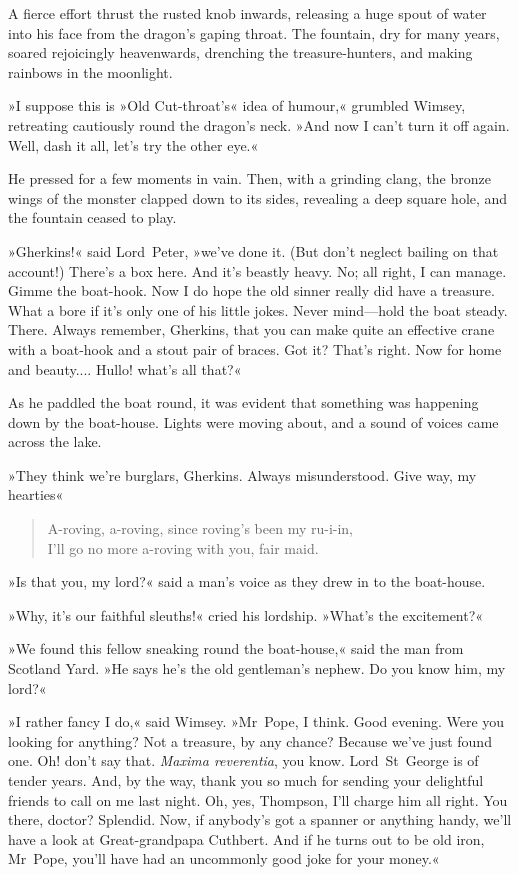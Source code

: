A fierce effort thrust the rusted knob inwards, releasing a huge spout of water into his face from the dragon's gaping throat. The fountain, dry for many years, soared rejoicingly heavenwards, drenching the treasure-hunters, and making rainbows in the moonlight.

»I suppose this is »Old Cut-throat's« idea of humour,« grumbled Wimsey, retreating cautiously round the dragon's neck. »And now I can't turn it off again. Well, dash it all, let's try the other eye.«

He pressed for a few moments in vain. Then, with a grinding clang, the bronze wings of the monster clapped down to its sides, revealing a deep square hole, and the fountain ceased to play.

»Gherkins!« said Lord~Peter, »we've done it. (But don't neglect bailing on that account!) There's a box here. And it's beastly heavy. No; all right, I can manage. Gimme the boat-hook. Now I do hope the old sinner really did have a treasure. What a bore if it's only one of his little jokes. Never mind—hold the boat steady. There. Always remember, Gherkins, that you can make quite an effective crane with a boat-hook and a stout pair of braces. Got it? That's right. Now for home and beauty.... Hullo! what's all that?«

As he paddled the boat round, it was evident that something was happening down by the boat-house. Lights were moving about, and a sound of voices came across the lake.

»They think we're burglars, Gherkins. Always misunderstood. Give way, my hearties\longdash«

\begin{quote}
A-roving, a-roving, since roving's been my ru-i-in,\\
I'll go no more a-roving with you, fair maid.
\end{quote}

»Is that you, my lord?« said a man's voice as they drew in to the boat-house.

»Why, it's our faithful sleuths!« cried his lordship. »What's the excitement?«

»We found this fellow sneaking round the boat-house,« said the man from Scotland Yard. »He says he's the old gentleman's nephew. Do you know him, my lord?«

»I rather fancy I do,« said Wimsey. »Mr~Pope, I think. Good evening. Were you looking for anything? Not a treasure, by any chance? Because we've just found one. Oh! don't say that. \textit{Maxima reverentia}, you know. Lord~St~George is of tender years. And, by the way, thank you so much for sending your delightful friends to call on me last night. Oh, yes, Thompson, I'll charge him all right. You there, doctor? Splendid. Now, if anybody's got a spanner or anything handy, we'll have a look at Great-grandpapa Cuthbert. And if he turns out to be old iron, Mr~Pope, you'll have had an uncommonly good joke for your money.«

